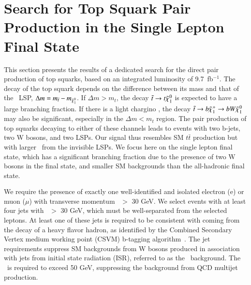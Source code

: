 \section{Search for Top Squark Pair Production in the Single Lepton Final State}
\label{sec:stop}

This section presents the results of a dedicated search for the direct pair production of top squarks, based on an integrated luminosity of 9.7~fb$^{-1}$.
The decay of the top squark depends on the difference between its mass and that of the \lsp\ LSP,
$\Delta m = m_{\tilde{t}}-m_{\tilde{\chi}_{1}^{0}}$. If $\Delta m > m_{t}$, the decay $\tilde{t}\to t\tilde{\chi}_{1}^{0}$ is expected
to have a large branching fraction. If there is a light chargino \chipm, the decay 
$\tilde{t}\to b\tilde{\chi}_{1}^{+}\to b W \tilde{\chi}_{1}^{0}$ may also be significant, especially in the $\Delta m < m_{t}$ region.
The pair production of top squarks decaying to either of these channels leads to events with two b-jets, two W bosons,
and two LSPs. Our signal thus resembles SM $t\bar{t}$ production but with larger \met\ from
the invisible LSPs.
We focus here on the single lepton final state, which has a significant branching fraction due to the presence of two W bosons
in the final state,
and smaller SM backgrounds than the all-hadronic final state.


We require the presence of exactly one well-identified and isolated electron (e) or muon ($\mu$) with transverse
momentum \pt\ $>$ 30 GeV. 
We select events with at least four jets with \pt\ $>$ 30 GeV,
which must be well-separated from the selected leptons.
At least one of these jets is required to be consistent with coming from the decay of a heavy flavor hadron, as
identified by the Combined Secondary Vertex medium working point (CSVM) b-tagging algorithm~\cite{ref:btag}.
The jet requirements suppress SM backgrounds from W bosons produced in association with jets from initial state
radiation (ISR), referred to as the \wjets\ background. 
The \met\ is required to exceed 50 GeV, suppressing the background from QCD multijet production.


